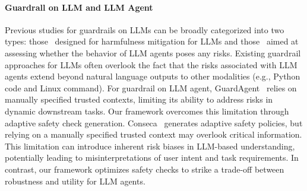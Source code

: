 \paragraph{Guardrall on LLM and LLM Agent} Previous studies for guardrails on LLMs can be broadly categorized into two types: those~\cite{rebedea-etal-2023-nemo, llama_guard_3_8b, yuan2024rigorllmresilientguardrailslarge, luo2025dynamicguideddomainapplicable} designed for harmfulness mitigation for LLMs and those~\cite{xiang2024guardagentsafeguardllmagents, naihin2023testinglanguagemodelagents, tsai2025contextkeyagentsecurity} aimed at assessing whether the behavior of LLM agents poses any risks. Existing guardrail approaches for LLMs often overlook the fact that the risks associated with LLM agents extend beyond natural language outputs to other modalities (e.g., Python code and Linux command). For guardrail on LLM agent, GuardAgent~\cite{xiang2024guardagentsafeguardllmagents} relies on manually specified trusted contexts, limiting its ability to address risks in dynamic downstream tasks. Our framework overcomes this limitation through adaptive safety check generation. Conseca~\cite{tsai2025contextkeyagentsecurity} generates adaptive safety policies, but relying on a manually specified trusted context may overlook critical information. This limitation can introduce inherent risk biases in LLM-based understanding, potentially leading to misinterpretations of user intent and task requirements. In contrast, our framework optimizes safety checks to strike a trade-off between robustness and utility for LLM agents.
